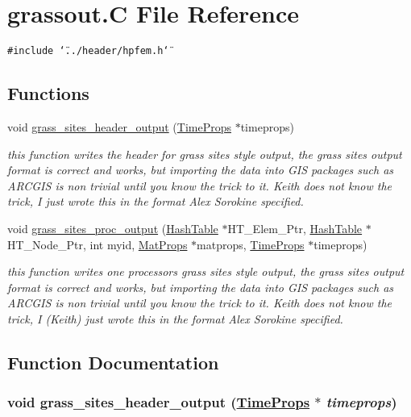 \hypertarget{grassout_8C}{
\section{grassout.C File Reference}
\label{grassout_8C}
}
{\tt \#include \char`\"{}../header/hpfem.h\char`\"{}}\par
\subsection*{Functions}
\begin{CompactItemize}
\item 
void \hyperlink{grassout_8C_a0}{grass\_\-sites\_\-header\_\-output} (\hyperlink{structTimeProps}{Time\-Props} $\ast$timeprops)
\begin{CompactList}\small\item\em this function writes the header for grass sites style output, the grass sites output format is correct and works, but importing the data into GIS packages such as ARCGIS is non trivial until you know the trick to it. Keith does not know the trick, I just wrote this in the format Alex Sorokine specified. \item\end{CompactList}\item 
void \hyperlink{grassout_8C_a1}{grass\_\-sites\_\-proc\_\-output} (\hyperlink{classHashTable}{Hash\-Table} $\ast$HT\_\-Elem\_\-Ptr, \hyperlink{classHashTable}{Hash\-Table} $\ast$HT\_\-Node\_\-Ptr, int myid, \hyperlink{structMatProps}{Mat\-Props} $\ast$matprops, \hyperlink{structTimeProps}{Time\-Props} $\ast$timeprops)
\begin{CompactList}\small\item\em this function writes one processors grass sites style output, the grass sites output format is correct and works, but importing the data into GIS packages such as ARCGIS is non trivial until you know the trick to it. Keith does not know the trick, I (Keith) just wrote this in the format Alex Sorokine specified. \item\end{CompactList}\end{CompactItemize}


\subsection{Function Documentation}
\hypertarget{grassout_8C_a0}{
\subsubsection[grass\_\-sites\_\-header\_\-output]{\setlength{\rightskip}{0pt plus 5cm}void grass\_\-sites\_\-header\_\-output (\hyperlink{structTimeProps}{Time\-Props} $\ast$ {\em timeprops})}}
\label{grassout_8C_a0}


